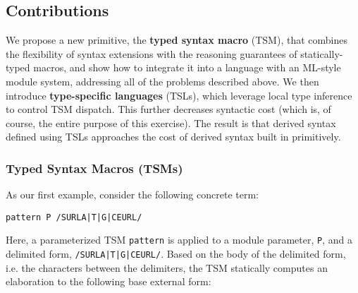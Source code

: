 \subsection{Contributions}\label{sec:syntax-contributions}
We propose a new primitive, the \textbf{typed syntax macro} (TSM), that combines the flexibility of syntax extensions with the reasoning guarantees of statically-typed macros, and show how to integrate it into a language with an ML-style module system, addressing all of the problems described above. We then introduce \textbf{type-specific languages} (TSLs), which leverage local type inference to control TSM dispatch. This further decreases syntactic cost (which is, of course, the entire purpose of this exercise). The result is that derived syntax defined using TSLs  approaches the cost of derived syntax built in primitively.

\subsubsection{Typed Syntax Macros (TSMs)}
As our first example, consider the following concrete term:
\begin{lstlisting}[numbers=none]
pattern P /SURLA|T|G|CEURL/
\end{lstlisting}
Here, a parameterized TSM \lstinline{pattern} is applied to a module parameter, \lstinline{P}, and a {delimited form}, \lstinline{/SURLA|T|G|CEURL/}. Based on the body of the delimited form, i.e. the characters between the delimiters, the TSM statically computes an elaboration to the following {base external form}:

